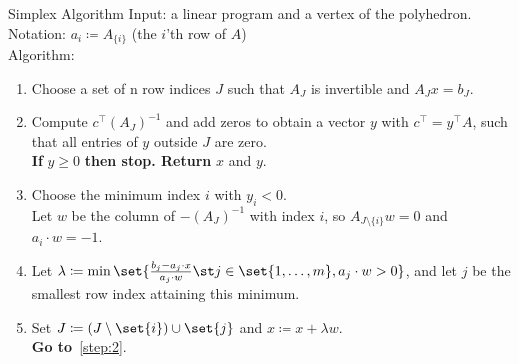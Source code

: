 \documentclass[a4paper, x11names, svgnames]{beamer}
\theoremstyle{definition}
\theoremstyle{plain}
\theoremstyle{plain}
\begin{document}
\begin{frame}{Simplex Algorithm}
    Input: a linear program and a vertex of the polyhedron. \\
    Notation: $a_i \coloneqq A_{\{i\}}$ (the $i$'th row of $A$) \\
    Algorithm:
    \begin{enumerate}
        \item \label{step:1}Choose a set of n row indices $J$ such that $A_J$ is invertible and $A_{J}x = b_J$.
        \pause
        \item \label{step:2} Compute $c^\top (A_J)^{-1}$ and add zeros to obtain a vector $y$ with $c^\top = y^\top A$,
              such that all entries of $y$ outside $J$ are zero. \\
              \textbf{If} $y\geq 0$ \textbf{then stop. Return} $x$ and $y$.
        \pause
        \item  \label{step:3}Choose the minimum index $i$ with $y_i < 0$. \\
              Let $w$ be the column of $-(A_J)^{-1}$ with index $i$, so $A_{J\setminus\{i\}}w=0$
              and $a_i \cdot w = -1$.
        \pause
        \item \label{step:4}Let $\lambda \coloneqq \min  \set{\frac{b_j - a_j\cdot x}{a_j\cdot w} \st j\in\set{1,\dots, m}, a_j\cdot w > 0}$,
              and let $j$ be the smallest row index attaining this minimum.
        \pause
        \item \label{step:5} Set $J\coloneqq (J\setminus\set{i})\cup \set{j}$ and $x\coloneqq x + \lambda w$. \\
              \textbf{Go to}~\ref{step:2}.
    \end{enumerate}
\end{frame}
\end{document}
